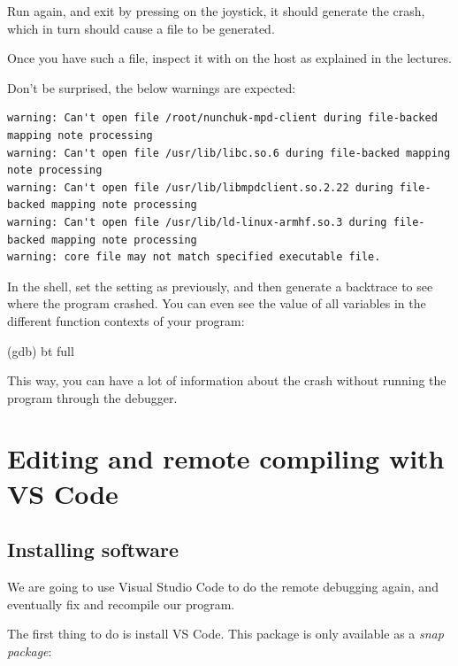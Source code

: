 Run  again, and exit by pressing  on
the joystick, it should generate the crash, which in turn should cause
a  file to be generated.

Once you have such a file, inspect it with 
on the host as explained in the lectures.

Don't be surprised, the below warnings are expected:

{\small
\begin{verbatim}
warning: Can't open file /root/nunchuk-mpd-client during file-backed mapping note processing
warning: Can't open file /usr/lib/libc.so.6 during file-backed mapping note processing
warning: Can't open file /usr/lib/libmpdclient.so.2.22 during file-backed mapping note processing
warning: Can't open file /usr/lib/ld-linux-armhf.so.3 during file-backed mapping note processing
warning: core file may not match specified executable file.
\end{verbatim}
}

In the  shell, set the  setting as previously, and then
generate a backtrace to see where the program crashed.
You can even see the value of all variables in the different
function contexts of your program:

\begin{bashinput}
(gdb) bt full
\end{bashinput}

This way, you can have a lot of information about the crash
without running the program through the debugger.

\section{Editing and remote compiling with VS Code}

\subsection{Installing software}

We are going to use Visual Studio Code to do the remote debugging
again, and eventually fix and recompile our program.

The first thing to do is install VS Code. This package is only available
as a {\em snap package}:


